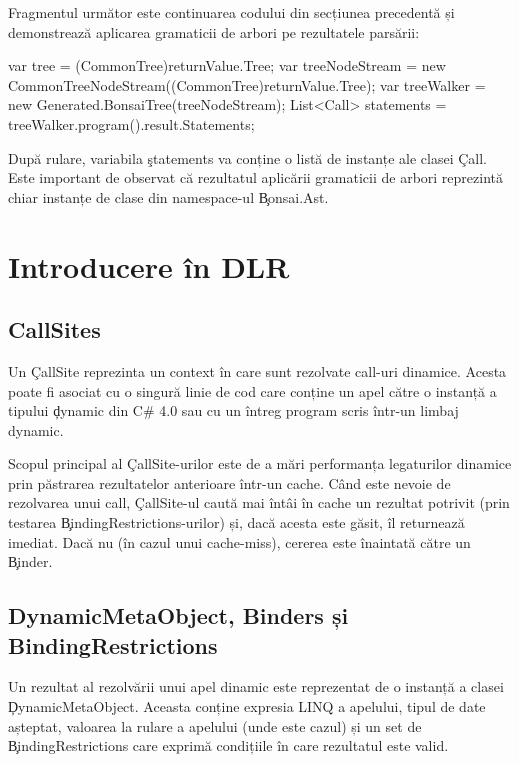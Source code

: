 \documentclass[12pt,a4paper]{memoir}
\begin{document}
Fragmentul următor este continuarea codului din secțiunea precedentă și demonstrează aplicarea gramaticii de arbori pe rezultatele parsării:

\begin{code}
var tree = (CommonTree)returnValue.Tree;
var treeNodeStream = 
    new CommonTreeNodeStream((CommonTree)returnValue.Tree);
var treeWalker = new Generated.BonsaiTree(treeNodeStream);
List<Call> statements = treeWalker.program().result.Statements;
\end{code}

După rulare, variabila \c{statements} va conține o listă de instanțe ale clasei \c{Call}. Este important de observat că rezultatul aplicării gramaticii de arbori reprezintă chiar instanțe de clase din namespace-ul \c{Bonsai.Ast}.

\chapter{Introducere în DLR}


\section{CallSites}

Un \c{CallSite} reprezinta un context în care sunt rezolvate call-uri dinamice. Acesta poate fi asociat cu o singură linie de cod care conține un apel către o instanță a tipului \c{dynamic} din C\# 4.0\cite{csharp_4_specs} sau cu un întreg program scris într-un limbaj dynamic. 

Scopul principal al \c{CallSite}-urilor este de a mări performanța legaturilor dinamice prin păstrarea rezultatelor anterioare într-un cache. Când este nevoie de rezolvarea unui call, \c{CallSite}-ul caută mai întâi în cache un rezultat potrivit (prin testarea \c{BindingRestrictions}-urilor) și, dacă acesta este găsit, îl returnează imediat. Dacă nu (în cazul unui cache-miss), cererea este înaintată către un \c{Binder}.

\section{DynamicMetaObject, Binders și BindingRestrictions}

Un rezultat al rezolvării unui apel dinamic este reprezentat de o instanță a clasei \c{DynamicMetaObject}\cite{dynamic_meta_object}. Aceasta conține expresia LINQ\cite{linq_expressions} a apelului, tipul de date așteptat, valoarea la rulare a apelului (unde este cazul) și un set de \c{BindingRestrictions} care exprimă condițiile în care rezultatul este valid.
\end{document}
